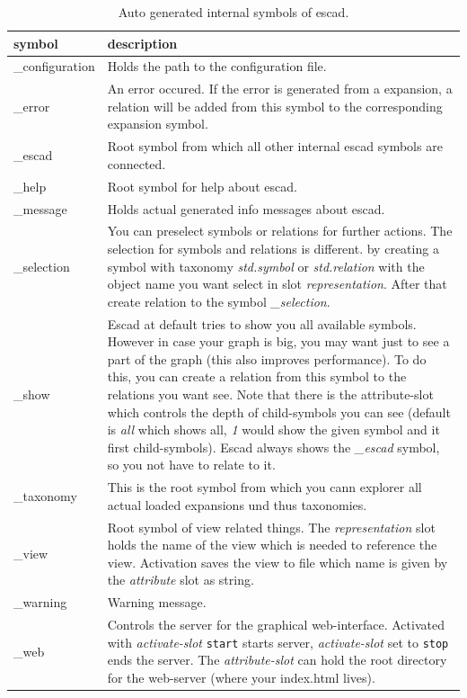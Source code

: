 \documentclass[a4paper, 12pt, openany]{scrbook}
\begin{document}
\begin{table}[htbp]
\centering
\begin{tabular}{|p{4cm}|p{12cm}|}
  \hline
  \textbf{symbol} & \textbf{description} \\
  \hline
  \_configuration & Holds the path to the configuration file. \\
  \hline
  \_error & An error occured. If the error is generated from a expansion, a relation will be added from this symbol to the corresponding expansion symbol. \\
  \hline
  \_escad & Root symbol from which all other internal escad symbols are connected. \\
  \hline
  \_help & Root symbol for help about escad. \\
  \hline
  \_message & Holds actual generated info messages about escad. \\
  \hline
  \_selection & You can preselect symbols or relations for further actions. The selection for symbols and relations is different. by creating a symbol with taxonomy \emph{std.symbol} or \emph{std.relation} with the object name you want select in slot \emph{representation}. After that create relation to the symbol \emph{\_selection}. \\
  \hline
  \_show & Escad at default tries to show you all available symbols. However in case your graph is big, you may want just to see a part of the graph (this also improves performance). To do this, you can create a relation from this symbol to the relations you want see. Note that there is the attribute-slot which controls the depth of child-symbols you can see (default is \emph{all} which shows all, \emph{1} would show the given symbol and it first child-symbols). Escad always shows the \emph{\_escad} symbol, so you not have to relate to it. \\
  \hline
  \_taxonomy & This is the root symbol from which you cann explorer all actual loaded expansions und thus taxonomies. \\
  \hline
  \_view & Root symbol of view related things. The \emph{representation} slot holds the name of the view which is needed to reference the view. Activation saves the view to file which name is given by the \emph{attribute} slot as string. \\
  \hline
  \_warning & Warning message. \\
  \hline
  \_web & Controls the server for the graphical web-interface. Activated with \emph{activate-slot} \texttt{start} starts server, \emph{activate-slot} set to \texttt{stop} ends the server. The \emph{attribute-slot} can hold the root directory for the web-server (where your index.html lives). \\
  \hline
\end{tabular}
\caption{Auto generated internal symbols of escad.}
\label{tab:internal-symbols}
\end{table}
\end{document}

